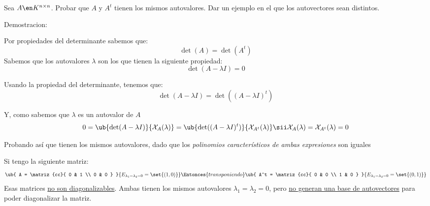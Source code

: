\begin{enunciado}{\ejercicio}
  Sea $A \en K^{n \times n}$. Probar que $A$ y $A^t$ tienen los mismos autovalores. Dar un ejemplo en el
  que los autovectores sean distintos.
\end{enunciado}

Demostracion:

Por propiedades del determinante sabemos que:
$$
  \det(A) = \det(A^t)
$$
Sabemos que los autovalores $\lambda$ son los que tienen la siguiente propiedad:
$$
  \det(A - \lambda I) = 0
$$

Usando la propiedad del determinante, tenemos que:
$$
  \det(A - \lambda I) = \det((A - \lambda I)^t)
$$

Y, como sabemos que $\lambda$ es un autovalor de $A$
$$
  0 =
  \ub{
    \det(A - \lambda I)
  }{\mathcal{X}_A(\lambda)} =
  \ub{
    \det((A - \lambda I)^t)
  }{\mathcal{X}_{A^t}(\lambda)}
  \sii
  \mathcal{X}_A(\lambda) = \mathcal{X}_{A^t}(\lambda) = 0
$$

Probando así que tienen los mismos autovalores, dado que los \textit{polinomios característicos de ambas expresiones} son iguales

Si tengo la siguiente matriz:
$$
  \ub{
    A =
    \matriz{cc}{
      0 & 1 \\
      0 & 0
    }
  }{
    E_{\lambda_1 = \lambda_2 = 0} = \set{(1,0)}
  }
  \Entonces{transponiendo}
  \ub{
    A^t =
    \matriz{cc}{
      0 & 0 \\
      1 & 0
    }
  }{
    E_{\lambda_1 = \lambda_2 = 0} = \set{(0,1)}
  }
$$
Esas matrices \underline{no son diagonalizables}. Ambas tienen los mismos autovalores $\lambda_1 = \lambda_2 = 0$,
pero \underline{no generan una base de autovectores} para poder diagonalizar la matriz.

\begin{aportes}
  \item {}
  \item {}
\end{aportes}
